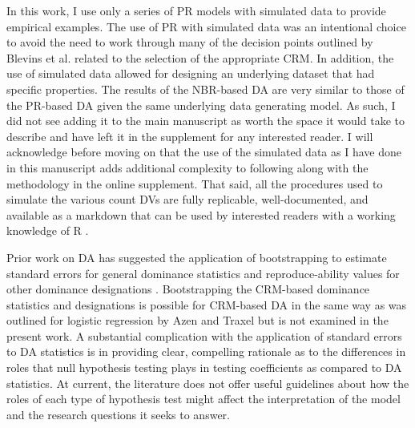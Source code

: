 \documentclass[man]{apa7}
\begin{document}
	In this work, I use only a series of PR models with simulated data to provide empirical examples.
	The use of PR with simulated data was an intentional choice to avoid the need to work through many of the decision points outlined by Blevins et al. \parencite*{blevins2015count} related to the selection of the appropriate CRM.
	In addition, the use of simulated data allowed for designing an underlying dataset that had specific properties.
	The results of the NBR-based DA are very similar to those of the PR-based DA given the same underlying data generating model.
	As such, I did not see adding it to the main manuscript as worth the space it would take to describe and have left it in the supplement for any interested reader.
	I will acknowledge before moving on that the use of the simulated data as I have done in this manuscript adds additional complexity to following along with the methodology in the online supplement.
	That said, all the procedures used to simulate the various count DVs are fully replicable, well-documented, and available as a markdown that can be used by interested readers with a working knowledge of R \parencite{R}.
	
	Prior work on DA has suggested the application of bootstrapping to estimate standard errors for general dominance statistics and reproduce-ability values for other dominance designations \parencite{azen2009using,braun2019accuracy}. 
	Bootstrapping the CRM-based dominance statistics and designations is possible for CRM-based DA in the same way as was outlined for logistic regression by Azen and Traxel \parencite*{azen2009using} but is not examined in the present work.
	A substantial complication with the application of standard errors to DA statistics is in providing clear, compelling rationale as to the differences in roles that null hypothesis testing plays in testing coefficients as compared to DA statistics.
	At current, the literature does not offer useful guidelines about how the roles of each type of hypothesis test might affect the interpretation of the model and the research questions it seeks to answer.
	
\end{document}

